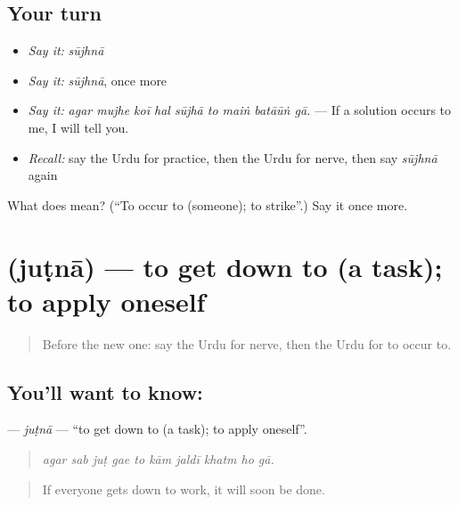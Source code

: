\subsection*{Your turn}
\begin{itemize}
\raggedright
  \item \emph{Say it:} \emph{sūjhnā}
  \item \emph{Say it:} \emph{sūjhnā}, once more
  \item \emph{Say it:} \emph{agar mujhe koī hal sūjhā to maiṅ batāūṅ gā.} — If a solution occurs to me, I will tell you.
  \item \emph{Recall:} say the Urdu for practice, then the Urdu for nerve, then say \emph{sūjhnā} again
\end{itemize}

\begin{tcolorbox}[breakable,colback=teal!4,colframe=teal!35!black,title={Before you move on}]
What does  mean? (\textquotedblleft{}To occur to (someone); to strike\textquotedblright{}.) Say it once more.
\end{tcolorbox}
\section[\texorpdfstring{\ur{جٹنا} (juṭnā)}{جٹنا (juṭnā)}]{ (juṭnā) — to get down to (a task); to apply oneself}

\label{lesson:UR-C380-jutna}



\begin{quote}
Before the new one: say the Urdu for nerve, then the Urdu for to occur to.
\end{quote}

\subsection*{You'll want to know: }
\textbf{} — \emph{juṭnā} — \textquotedblleft{}to get down to (a task); to apply oneself\textquotedblright{}.

\begin{quote}
         
\end{quote}

\begin{quote}
\emph{agar sab juṭ gae to kām jaldī khatm ho gā.}
\end{quote}

\begin{quote}
If everyone gets down to work, it will soon be done.
\end{quote}

